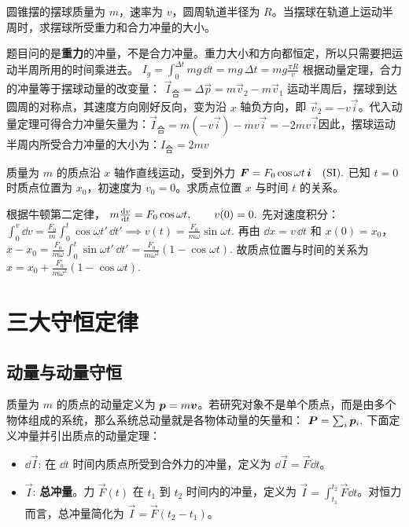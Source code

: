 \documentclass[lang=cn,11pt]{elegantbook}
\begin{document}
\begin{exercise}
圆锥摆的摆球质量为 \(m\)，速率为 \(v\)，圆周轨道半径为 \(R\)。当摆球在轨道上运动半周时，求摆球所受重力和合力冲量的大小。
\end{exercise}
\begin{solution}
题目问的是\textbf{重力}的冲量，不是合力冲量。重力大小和方向都恒定，所以只需要把运动半周所用的时间乘进去。
 \(I_g=\int_0^{\Delta t} mg\,\dd t=mg\,\Delta t=mg\frac{\pi R}{v}\) 根据动量定理，合力的冲量等于摆球动量的改变量： \(\vec{I}_{\text{合}} = \Delta \vec{p} = m\vec{v}_2 - m\vec{v}_1\) 运动半周后，摆球到达圆周的对称点，其速度方向刚好反向，变为沿 $x$ 轴负方向，即 $\vec{v}_2 = -v\vec{i}$。代入动量定理可得合力冲量矢量为：$\vec{I}_{\text{合}} = m(-v\vec{i}) - mv\vec{i} = -2mv\vec{i}$因此，摆球运动半周内所受合力冲量的大小为：$I_{\text{合}} = 2mv$
\end{solution}


\begin{exercise}
质量为 \(m\) 的质点沿 \(x\) 轴作直线运动，受到外力
 \(\vb*{F}=F_0\cos\omega t\,\vb*{i}\quad(\mathrm{SI}).\) 
已知 \(t=0\) 时质点位置为 \(x_0\)，初速度为 \(v_0=0\)。求质点位置 \(x\) 与时间 \(t\) 的关系。
\end{exercise}
\begin{solution}
根据牛顿第二定律，
 \(m\dv{v}{t}=F_0\cos\omega t,\qquad v(0)=0.\) 
先对速度积分：
 \(\int_0^v \dd v =\frac{F_0}{m}\int_0^t \cos\omega t'\,\dd t' \implies v(t)=\frac{F_0}{m\omega}\sin\omega t.\) 
再由 \(\dd x=v\,\dd t\) 和 \(x(0)=x_0\)，
 \(x-x_0 =\frac{F_0}{m\omega}\int_0^t \sin\omega t'\,\dd t' =\frac{F_0}{m\omega^2}(1-\cos\omega t).\) 
故质点位置与时间的关系为
 \(x=x_0+\frac{F_0}{m\omega^2}(1-\cos\omega t).\) 
\end{solution}



\chapter{三大守恒定律}

\section{动量与动量守恒}

\begin{definition}[动量和冲量]\label{def:momentum}
质量为 \(m\) 的质点的动量定义为 \(\vb*{p}=m\vb*{v}\)。若研究对象不是单个质点，而是由多个物体组成的系统，那么系统总动量就是各物体动量的矢量和：
 \(\vb*{P}=\sum_i \vb*{p}_i.\) 下面定义冲量并引出质点的动量定理：
\begin{itemize}
\item $\dd\vec{I}$: 在 $\dd t$ 时间内质点所受到合外力的冲量，定义为 $\dd\vec{I}=\vec{F}\dd t$。
\item $\vec{I}$: \textbf{总冲量}。力 $\vec{F}(t)$ 在 $t_1$ 到 $t_2$ 时间内的冲量，定义为 $\vec{I}=\int_{t_1}^{t_2}\vec{F}\dd t$。对恒力而言，总冲量简化为 $\vec{I}=\vec{F}(t_2-t_1)$。
\end{itemize}
\end{definition}
\end{document}
